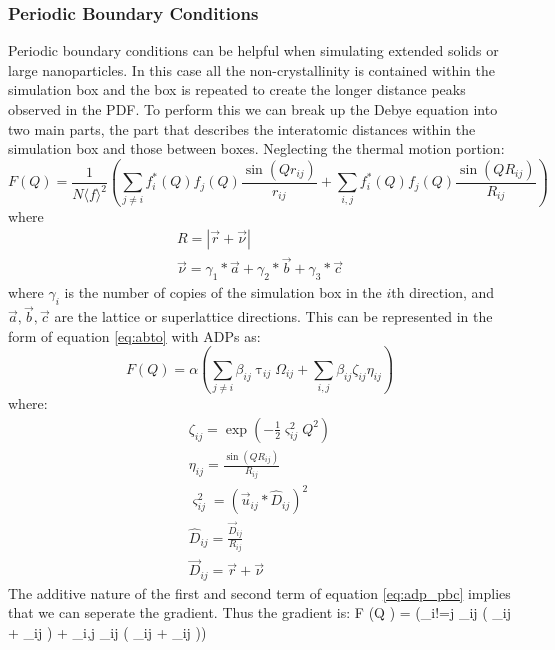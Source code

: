 \subsubsection{Periodic Boundary Conditions}
Periodic boundary conditions can be helpful when simulating extended solids or large nanoparticles. In this case all the non-crystallinity is contained within the simulation box and the box is repeated to create the longer distance peaks observed in the PDF. To perform this we can break up the Debye equation into two main parts, the part that describes the interatomic distances within the simulation box and those between boxes. Neglecting the thermal motion portion:
\begin{equation}
  F(Q) = \frac{1}{N \langle f \rangle^{2}}(\sum_{j\neq i} f_i^{*}(Q)f_j(Q) \frac{\sin(Qr_{ij})}{r_{ij}} + \sum_{i,j} f_i^{*}(Q)f_j(Q) \frac{\sin(QR_{ij})}{R_{ij}})
\end{equation}
where
\begin{eqnarray}
  R = |\vec{r} + \vec{\nu}|\\
  \vec{\nu} = \gamma_1*\vec{a} + \gamma_2*\vec{b} + \gamma_3*\vec{c}
\end{eqnarray}
where $\gamma_{i}$ is the number of copies of the simulation box in the $i$th direction, and $\vec{a}, \vec{b}, \vec{c}$ are the lattice or superlattice directions.
This can be represented in the form of equation \ref{eq:abto} with ADPs as:
\begin{equation}
F(Q) = \alpha(\sum_{j\neq i}  \beta_{ij} \uptau_{ij} \Omega_{ij} + \sum_{i,j}  \beta_{ij} \zeta_{ij} \eta_{ij}) \label{eq:adp_pbc}
\end{equation}
where:
\begin{eqnarray}
    \zeta_{ij} = \exp(-\frac{1}{2}\varsigma_{ij}^{2}Q^{2}) \label{eq:zeta}\\
    \eta_{ij} = \frac{\sin(QR_{ij})}{R_{ij}} \label{eq:eta}\\
    \varsigma_{ij}^{2} = (\vec{u}_{ij} * \hat{D}_{ij})^{2}\\
    \hat{D}_{ij} = \frac{\vec{D}_{ij}}{R_{ij}}\\
    \vec{D}_{ij} = \vec{r} + \vec{\nu}
\end{eqnarray}
The additive nature of the first and second term of equation \ref{eq:adp_pbc} implies that we can seperate the gradient.
Thus the gradient is:
 F{ (Q )} = \alpha (\sum_{i!=j} \beta_{ij} (  \Omega_{ij} + \uptau_{ij} ) + \sum_{i,j} \beta_{ij} (  \Omega_{ij} + \uptau_{ij} )) \label{eq:pbc_grad_fq}
